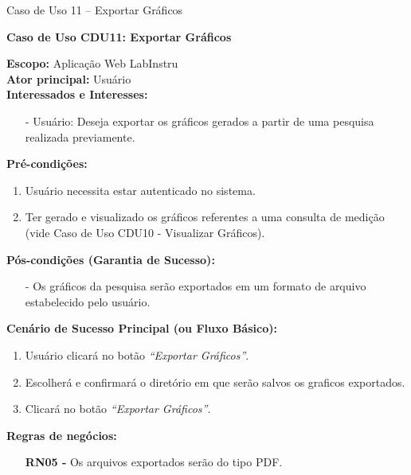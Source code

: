 \begin{quadro}[h!]\caption{Caso de Uso 11 --  Exportar Gráficos}
\hfill
\end{quadro}
	\begin{mdframed}

		\textbf{Caso de Uso CDU11: Exportar Gráficos}\\

		\begin{flushleft}

		\textbf{Escopo:} Aplicação Web LabInstru\\

		\textbf{Ator principal:} Usuário\\

		\textbf{Interessados e Interesses:}
		\begin{itemize}
			\item[-] Usuário: Deseja exportar os gráficos gerados a partir de uma pesquisa realizada previamente.
		\end{itemize}

		\textbf{Pré-condições:}\\
			 \begin{enumerate}
			 	\item{Usuário necessita estar autenticado no sistema.}
			 	\item{Ter gerado e visualizado os gráficos referentes a uma consulta de medição (vide Caso de Uso CDU10 - Visualizar Gráficos).}
			 \end{enumerate}

		\textbf{Pós-condições (Garantia de Sucesso):}
		\begin{itemize}
			\item[-] Os gráficos da pesquisa serão exportados em um formato de arquivo estabelecido pelo usuário.
		\end{itemize}

		\textbf{Cenário de Sucesso Principal (ou Fluxo Básico):}\\
			\begin{enumerate}
			 	\item{Usuário clicará no botão \textit{``Exportar Gráficos''}.}
			 	\item{Escolherá e confirmará o diretório em que serão salvos os graficos exportados.}
			 	\item{Clicará no botão \textit{``Exportar Gráficos''}.}
			 \end{enumerate}

		\textbf{Regras de negócios:}
		\begin{itemize}
			\item[] \textbf{RN05 - } Os arquivos exportados serão do tipo PDF.
		\end{itemize}
		\end{flushleft}

	\end{mdframed}



